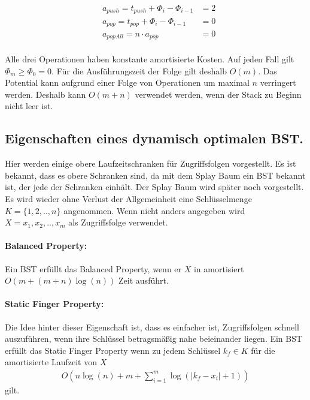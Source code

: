 \documentclass[a4paper,12pt]{article}
\begin{document}
\begin{align*}   
&a_{\mathit{push}} = t_{\mathit{push}} + \Phi_{i} - \Phi_{i-1}  &= 2\\
&a_{\mathit{pop}} = t_{\mathit{pop}} + \Phi_{i} - \Phi_{i-1}  &= 0\\
&a_{\mathit{popAll}} = n \cdot a_{\mathit{pop}} &= 0
\end{align*}\\
Alle drei Operationen haben konstante amortisierte Kosten. Auf jeden Fall gilt $ \Phi_m \geq  \Phi_0 = 0 $. Für die Ausführungszeit der Folge gilt deshalb $O(m)$. Das Potential kann aufgrund einer Folge von Operationen um maximal $n$ verringert werden. Deshalb kann $O\left(m + n\right)$ verwendet werden, wenn der Stack zu Beginn nicht leer ist.  \\



\subsection{Eigenschaften eines dynamisch optimalen BST. }\label{upperBounds}
Hier werden einige obere Laufzeitschranken für Zugriffsfolgen vorgestellt. Es ist bekannt, dass es obere Schranken sind, da mit dem Splay Baum ein BST bekannt ist, der jede der Schranken einhält. Der Splay Baum wird später noch vorgestellt. Es wird wieder ohne Verlust der Allgemeinheit eine Schlüsselmenge $K = \{1,2,..,n\}$ angenommen. Wenn nicht anders angegeben wird  $X = x_1,x_2,..,x_m$ als Zugriffsfolge verwendet. 


\paragraph{Balanced Property:}
Ein BST erfüllt das Balanced Property, wenn er $X$ in amortisiert $O\left(m + \left(m + n\right) \log \left( n\right)  \right)$ Zeit ausführt. 

\paragraph{Static Finger Property:}
Die Idee hinter dieser Eigenschaft ist, dass es einfacher ist, Zugriffsfolgen schnell auszuführen, wenn ihre Schlüssel betragsmäßig nahe beieinander liegen. Ein BST erfüllt das Static Finger Property wenn zu jedem Schlüssel $k_f \in K$ für die amortisierte Laufzeit von $X$ 
\begin{align*}
O\left( n \log\left( n\right) +m + \sum_{i = 1}^{m} \log \left( \vert k_f - x_i  \vert	+ 1	\right)\right)
\end{align*}
gilt. 
\end{document}
